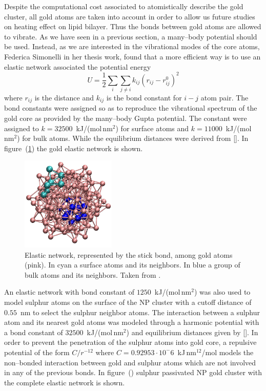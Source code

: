 Despite the computational cost associated to atomistically describe the gold cluster, all gold atoms are taken into account in order to allow us future studies on heating effect on lipid bilayer. Thus the bonds between gold atoms are allowed to vibrate. As we have seen in a previous section, a many--body potential should be used. Instead, as we are interested in the vibrational modes of the core atoms, Federica Simonelli in her thesis work, found that a more efficient way is to use an elastic network associated the potential energy
\begin{equation*}
	U = \frac{1}{2}\sum_i \sum_{j\ne i}k_{ij}(r_{ij} - r_{ij}^0)^2
\end{equation*}
where $r_{ij}$ is the distance and $k_{ij}$ is the bond constant for $i-j$ atom pair. The bond constants were assigned so as to reproduce the vibrational spectrum of the gold core as provided by the many--body Gupta potential. The constant were assigned to $k = 32500$~kJ/(mol\,nm$^2$) for surface atoms and $k = 11000$~kJ/(mol\,nm$^2$) for bulk atoms. While the equilibrium distances were derived from []. In figure~(\ref{fig:goldNetwork}) the gold elastic network is shown.
\begin{figure}
	\centering
	\includegraphics[width=0.4\textwidth]{./img/goldNetwork}
	\caption{Elastic network, represented by the stick bond, among gold atoms (pink). In cyan a surface atoms and its neighbors. In blue a group of bulk atoms and its neighbors. Taken from \cite{simonelliThesis}.}
	\label{fig:goldNetwork}
\end{figure}

An elastic network with bond constant of $1250$~kJ/(mol\,nm$^2$) was also used to model sulphur atoms on the surface of the \ac{NP} cluster with a cutoff distance of $0.55$~nm to select the sulphur neighbor atoms. The interaction between a sulphur atom and its nearest gold atoms was modeled through a harmonic potential with a bond constant of $32500$~kJ/(mol\,nm$^2$) and equilibrium distances given by []. In order to prevent the penetration of the sulphur atoms into gold core, a repulsive potential of the form $C/r^{-12}$ where $C = 0.92953\cdot 10^-6$~kJ\,nm$^{12}$/mol models the non--bonded interaction between gold and sulphur atoms which are not involved in any of the previous bonds. In figure~() sulphur passivated \ac{NP} gold cluster with the complete elastic network is shown.

